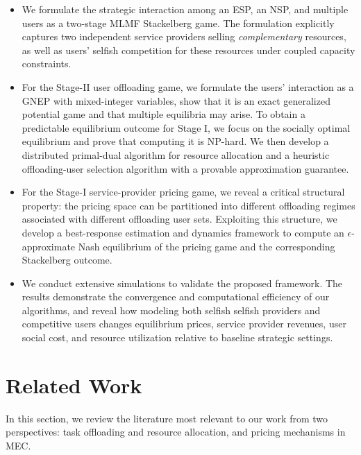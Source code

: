 \documentclass[lettersize,journal]{IEEEtran}
\begin{document}
\begin{itemize}
\item We formulate the strategic interaction among an ESP, an NSP, and multiple users as a two-stage MLMF Stackelberg game. The formulation explicitly captures two independent service providers selling \emph{complementary} resources, as well as users’ selfish competition for these resources under coupled capacity constraints.

\item For the Stage-II user offloading game, we formulate the users’ interaction as a GNEP with mixed-integer variables, show that it is an exact generalized potential game and that multiple equilibria may arise. To obtain a predictable equilibrium outcome for Stage I, we focus on the socially optimal equilibrium and prove that computing it is NP-hard. We then develop a distributed primal-dual algorithm for resource allocation and a heuristic offloading-user selection algorithm with a provable approximation guarantee.

\item For the Stage-I service-provider pricing game, we reveal a critical structural property: the pricing space can be partitioned into different offloading regimes associated with different offloading user sets. Exploiting this structure, we develop a best-response estimation and dynamics framework to compute an $\epsilon$-approximate Nash equilibrium of the pricing game and the corresponding Stackelberg outcome.

\item We conduct extensive simulations to validate the proposed framework. The results demonstrate the convergence and computational efficiency of our algorithms, and reveal how modeling both selfish selfish providers and competitive users changes equilibrium prices, service provider revenues, user social cost, and resource utilization relative to baseline strategic settings.
\end{itemize}


\section{Related Work}
In this section, we review the literature most relevant to our work from two perspectives: task offloading and resource allocation, and pricing mechanisms in MEC.
\end{document}
